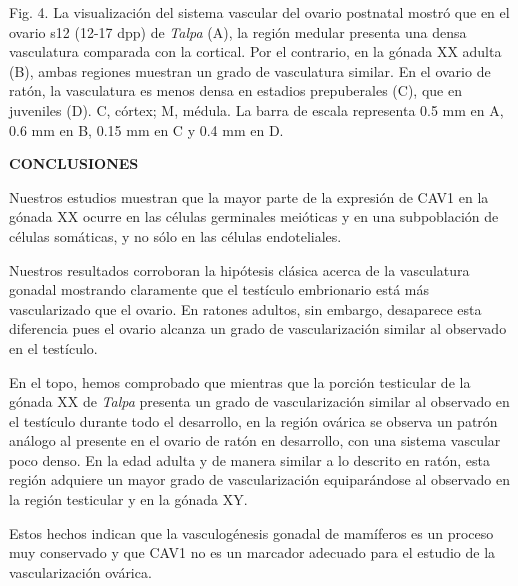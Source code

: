 \documentclass[a0,portrait]{a0poster}
\newcommand{\apartado}[1]{\noindent\fontsize{45pt}{45pt}\selectfont\textcolor[rgb]{0,0,1}{\textbf{\uppercase{#1}}}}
\newcommand{\texto}[1]{\fontsize{30pt}{30pt}\selectfont #1}
\begin{document}
\begin{multicols*}{2}
\begin{center}
\begin{minipage}[t]{\columnwidth}
\begin{framed}
Fig. 4. La visualización del sistema vascular del ovario postnatal mostró que en el ovario s12 (12-17 dpp) de \emph{Talpa} (A), la región medular presenta una densa vasculatura comparada con la cortical. Por el contrario, en la gónada XX adulta (B), ambas regiones muestran un grado de vasculatura similar. En el ovario de ratón, la vasculatura es menos densa en estadios prepuberales (C), que en juveniles (D). C, córtex; M, médula. La barra de escala representa 0.5 mm en A, 0.6 mm en B, 0.15 mm en C y 0.4 mm en D.\end{framed}
\end{minipage}
\end{center}

\apartado{Conclusiones}

\texto{
Nuestros estudios muestran que la mayor parte de la expresión de CAV1 en la gónada XX ocurre en las células germinales meióticas y en una subpoblación de células somáticas, y no sólo en las células endoteliales. 

Nuestros resultados corroboran la hipótesis clásica acerca de la vasculatura gonadal mostrando claramente que el testículo embrionario está más vascularizado que el ovario. En ratones adultos, sin embargo, desaparece esta diferencia pues el ovario alcanza un grado de vascularización similar al observado en el testículo.

En el topo, hemos comprobado que mientras que la porción testicular de la gónada XX de \emph{Talpa} presenta un grado de vascularización similar al observado en el testículo durante todo el desarrollo, en la región ovárica se observa un patrón análogo al presente en el ovario de ratón en desarrollo, con una sistema vascular poco denso. En la edad adulta y de manera similar a lo descrito en ratón, esta región adquiere un mayor grado de vascularización equiparándose al observado en la región testicular y en la gónada XY. 

Estos hechos indican que la vasculogénesis gonadal de mamíferos es un proceso muy conservado y que CAV1 no es un marcador adecuado para el estudio de la vascularización ovárica.

}

\end{multicols*}
\end{document}
